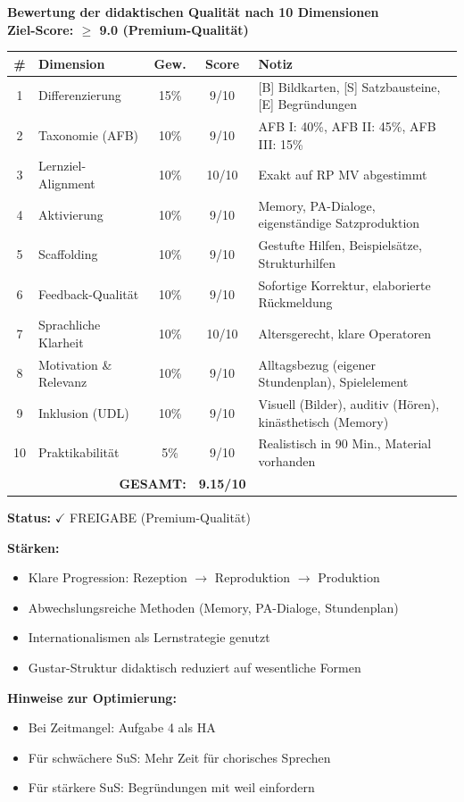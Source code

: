 \documentclass[11pt,a4paper]{article}
\begin{document}
\begin{scorebox}
\textbf{Bewertung der didaktischen Qualität nach 10 Dimensionen}\\
\textbf{Ziel-Score: $\geq$ 9.0 (Premium-Qualität)}

\vspace{1em}
\begin{tabular}{|c|l|c|c|p{4.5cm}|}
\hline
\textbf{\#} & \textbf{Dimension} & \textbf{Gew.} & \textbf{Score} & \textbf{Notiz} \\
\hline
1 & Differenzierung & 15\% & 9/10 & [B] Bildkarten, [S] Satzbausteine, [E] Begründungen \\
\hline
2 & Taxonomie (AFB) & 10\% & 9/10 & AFB I: 40\%, AFB II: 45\%, AFB III: 15\% \\
\hline
3 & Lernziel-Alignment & 10\% & 10/10 & Exakt auf RP MV abgestimmt \\
\hline
4 & Aktivierung & 10\% & 9/10 & Memory, PA-Dialoge, eigenständige Satzproduktion \\
\hline
5 & Scaffolding & 10\% & 9/10 & Gestufte Hilfen, Beispielsätze, Strukturhilfen \\
\hline
6 & Feedback-Qualität & 10\% & 9/10 & Sofortige Korrektur, elaborierte Rückmeldung \\
\hline
7 & Sprachliche Klarheit & 10\% & 10/10 & Altersgerecht, klare Operatoren \\
\hline
8 & Motivation \& Relevanz & 10\% & 9/10 & Alltagsbezug (eigener Stundenplan), Spielelement \\
\hline
9 & Inklusion (UDL) & 10\% & 9/10 & Visuell (Bilder), auditiv (Hören), kinästhetisch (Memory) \\
\hline
10 & Praktikabilität & 5\% & 9/10 & Realistisch in 90 Min., Material vorhanden \\
\hline
\multicolumn{3}{|r|}{\textbf{GESAMT:}} & \textbf{9.15/10} & \\
\hline
\end{tabular}

\vspace{1em}
\textbf{Status:} \textcolor{successgreen}{$\checkmark$ FREIGABE (Premium-Qualität)}

\vspace{1em}
\textbf{Stärken:}
\begin{itemize}
    \item Klare Progression: Rezeption $\rightarrow$ Reproduktion $\rightarrow$ Produktion
    \item Abwechslungsreiche Methoden (Memory, PA-Dialoge, Stundenplan)
    \item Internationalismen als Lernstrategie genutzt
    \item Gustar-Struktur didaktisch reduziert auf wesentliche Formen
\end{itemize}

\textbf{Hinweise zur Optimierung:}
\begin{itemize}
    \item Bei Zeitmangel: Aufgabe 4 als HA
    \item Für schwächere SuS: Mehr Zeit für chorisches Sprechen
    \item Für stärkere SuS: Begründungen mit weil einfordern
\end{itemize}

\end{scorebox}
\end{document}
